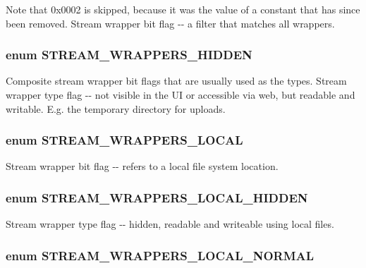 Note that 0x0002 is skipped, because it was the value of a constant that has since been removed. Stream wrapper bit flag -\/-\/ a filter that matches all wrappers. \hypertarget{stream__wrappers_8inc_a47c8b4e8cd87675bf66f39a328757f87}{
\subsubsection[{STREAM\_\-WRAPPERS\_\-HIDDEN}]{\setlength{\rightskip}{0pt plus 5cm}enum {\bf STREAM\_\-WRAPPERS\_\-HIDDEN}}}
\label{stream__wrappers_8inc_a47c8b4e8cd87675bf66f39a328757f87}
Composite stream wrapper bit flags that are usually used as the types. Stream wrapper type flag -\/-\/ not visible in the UI or accessible via web, but readable and writable. E.g. the temporary directory for uploads. \hypertarget{stream__wrappers_8inc_a39ccf9b3cad23926ae87f5c5e9d9f05d}{
\subsubsection[{STREAM\_\-WRAPPERS\_\-LOCAL}]{\setlength{\rightskip}{0pt plus 5cm}enum {\bf STREAM\_\-WRAPPERS\_\-LOCAL}}}
\label{stream__wrappers_8inc_a39ccf9b3cad23926ae87f5c5e9d9f05d}
Stream wrapper bit flag -\/-\/ refers to a local file system location. \hypertarget{stream__wrappers_8inc_a93d62c940aa35a365d0226379dcb9a8e}{
\subsubsection[{STREAM\_\-WRAPPERS\_\-LOCAL\_\-HIDDEN}]{\setlength{\rightskip}{0pt plus 5cm}enum {\bf STREAM\_\-WRAPPERS\_\-LOCAL\_\-HIDDEN}}}
\label{stream__wrappers_8inc_a93d62c940aa35a365d0226379dcb9a8e}
Stream wrapper type flag -\/-\/ hidden, readable and writeable using local files. \hypertarget{stream__wrappers_8inc_a2c85af579fa282a57c975e99eba90c63}{
\subsubsection[{STREAM\_\-WRAPPERS\_\-LOCAL\_\-NORMAL}]{\setlength{\rightskip}{0pt plus 5cm}enum {\bf STREAM\_\-WRAPPERS\_\-LOCAL\_\-NORMAL}}}
